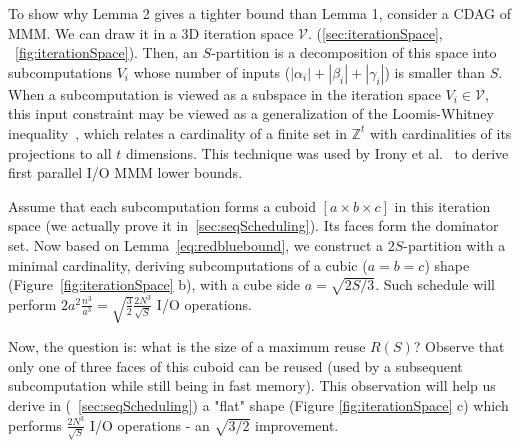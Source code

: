 \label{sec:mmmExample}


To show why Lemma 2 gives a tighter bound than Lemma 1, consider a CDAG of 
MMM.  We can draw it in a 3D iteration space $\mathcal{V}$.
(\cref{sec:iterationSpace}, ~\ref{fig:iterationSpace}). Then,
an $S$-partition is a decomposition of this space into subcomputations $V_i$ 
whose
number of inputs ($|\alpha_i| + |\beta_i| + |\gamma_i|$) is smaller than $S$.
When a subcomputation is viewed as a subspace in the iteration space $V_i \in 
\mathcal{V}$, this input constraint may be viewed as a generalization of the 
Loomis-Whitney inequality~\cite{loomisWhitney}, which relates a cardinality of 
a 
finite set in $\mathbb{Z}^t$ with cardinalities of its projections to all $t$ 
dimensions. This technique was used by Irony et al.~\cite{loomisApplied} to 
derive first parallel I/O MMM lower bounds.

Assume that each subcomputation forms a cuboid $[a \times b \times c]$ in this
iteration space (we actually prove it in~\cref{sec:seqScheduling}). Its
faces form the dominator set.  Now based on Lemma~\ref{eq:redbluebound}, we 
construct a $2S$-partition with a
minimal cardinality, deriving subcomputations of a cubic ($a = b = c$) shape
(Figure~\ref{fig:iterationSpace} b), with a cube side $a = \sqrt{2S/3}$.  Such
schedule will perform $2a^2 \frac{n^3}{a^3} =
\sqrt{\frac{3}{2}}\frac{2N^3}{\sqrt{S}}$ I/O operations. 

Now, the question is: what is the size of a maximum reuse $R(S)$? Observe that
only one of three faces of this cuboid can be reused (used by a subsequent
subcomputation while still being in fast memory). This observation will help us
derive in (~\cref{sec:seqScheduling}) a "flat" shape (Figure 
\ref{fig:iterationSpace}
c) which performs $\frac{2N^3}{\sqrt{S}}$ I/O operations - an $\sqrt{3/2}$
improvement.


